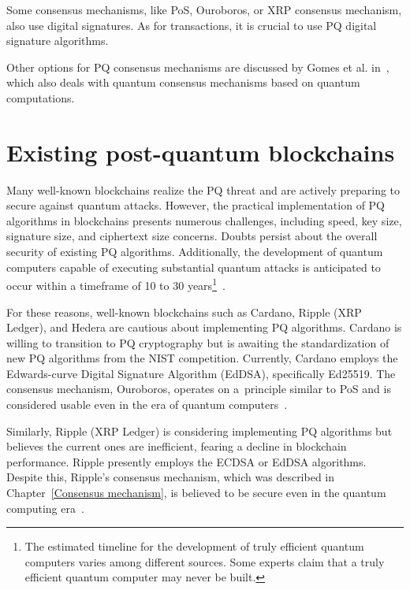 Some consensus mechanisms, like PoS, Ouroboros, or XRP consensus mechanism, also use digital signatures. As for transactions, it is crucial to use PQ digital signature algorithms.

Other options for PQ consensus mechanisms are discussed by Gomes et al. in~\cite{PQ.consensus.sol}, which also deals with quantum consensus mechanisms based on quantum computations.



\section{Existing post-quantum blockchains}
\label{QR.blockchains}

Many well-known blockchains realize the PQ threat and are actively preparing to secure against quantum attacks. However, the practical implementation of PQ algorithms in blockchains presents numerous challenges, including speed, key size, signature size, and ciphertext size concerns. Doubts persist about the overall security of existing PQ algorithms. Additionally, the development of quantum computers capable of executing substantial quantum attacks is anticipated to occur within a timeframe of 10 to 30 years\footnote{The estimated timeline for the development of truly efficient quantum computers varies among different sources. Some experts claim that a truly efficient quantum computer may never be built.}~\cite{pqc.towards.bc.8967098}.

For these reasons, well-known blockchains such as Cardano, Ripple (XRP Ledger), and Hedera are cautious about implementing PQ algorithms. Cardano is willing to transition to PQ cryptography but is awaiting the standardization of new PQ algorithms from the NIST competition. Currently, Cardano employs the Edwards-curve Digital Signature Algorithm (EdDSA), specifically Ed25519. The consensus mechanism, Ouroboros, operates on a~principle similar to PoS and is considered usable even in the era of quantum computers~\cite{cardano.web}.

Similarly, Ripple (XRP Ledger) is considering implementing PQ algorithms but believes the current ones are inefficient, fearing a decline in blockchain performance. Ripple presently employs the ECDSA or EdDSA algorithms. Despite this, Ripple's consensus mechanism, which was described in Chapter~\ref{Consensus mechanism}, is believed to be secure even in the quantum computing era~\cite{xrp.web}.

